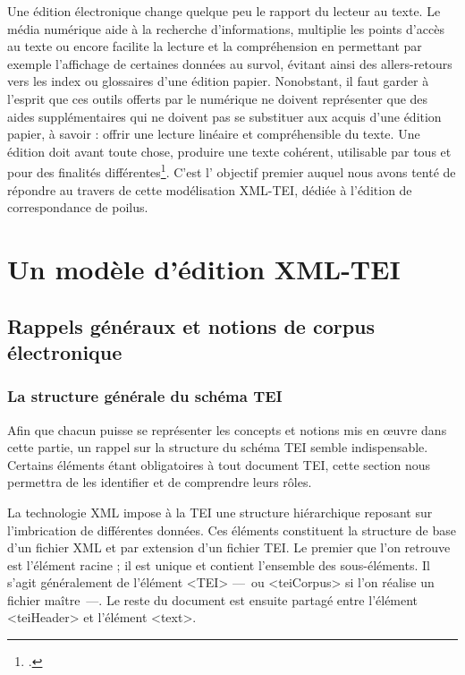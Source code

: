 \documentclass[12pt,a4paper]{book} %
\begin{document}
Une édition électronique change quelque peu le rapport du lecteur au texte. Le média numérique aide à la recherche d'informations, multiplie les points d'accès au texte ou encore facilite la lecture et la compréhension en permettant par exemple l'affichage de certaines données au survol, évitant ainsi des allers-retours vers les index ou glossaires d'une édition papier. 
Nonobstant, il faut garder à l'esprit que ces outils offerts par le numérique ne doivent représenter que des aides supplémentaires qui ne doivent pas se substituer aux acquis d'une édition papier, à savoir : offrir une lecture linéaire et compréhensible du texte.
Une édition doit avant toute chose, produire une texte cohérent, utilisable par tous et pour des finalités différentes\footcite{desenclos_early_2015}.
C'est l' objectif premier auquel nous avons tenté de répondre au travers de cette modélisation XML-TEI, dédiée à l'édition de correspondance de poilus.




\part{Un modèle d'édition XML-TEI}

\chapter{Rappels généraux et notions de corpus électronique}

\section{La structure générale du schéma TEI}
Afin que chacun puisse se représenter les concepts et notions mis en œuvre dans cette partie, un rappel sur la structure du schéma TEI semble indispensable. Certains éléments étant obligatoires à tout document TEI, cette section nous permettra de les identifier et de comprendre leurs rôles. 

La technologie XML impose à la TEI une structure hiérarchique reposant sur l'imbrication de différentes données. Ces éléments constituent la structure de base d'un fichier XML et par extension d'un fichier TEI. Le premier que l'on retrouve est l'élément racine ; il est unique et contient l'ensemble des sous-éléments. Il s'agit généralement de l'élément <TEI> ---~ou <teiCorpus> si l'on réalise un fichier maître~---.
Le reste du document est ensuite partagé entre l'élément <teiHeader> et l'élément <text>.
\bigskip
\end{document}
